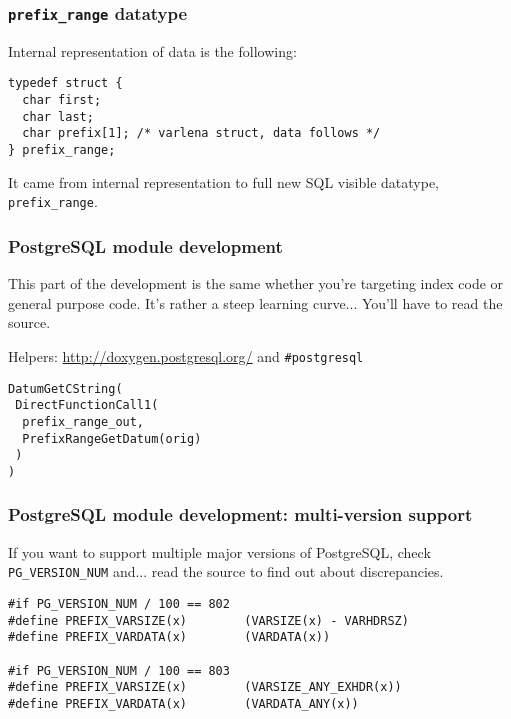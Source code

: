 \documentclass{beamer}
\begin{document}
\begin{frame}[fragile]
  \frametitle{\texttt{prefix\_range} datatype}

  Internal representation of data is the following:

  \begin{example}
  \begin{verbatim}
typedef struct {
  char first;
  char last;
  char prefix[1]; /* varlena struct, data follows */
} prefix_range;
  \end{verbatim}
  \end{example}

  It came from internal representation to full new SQL visible datatype,
  \texttt{prefix\_range}.
\end{frame}

\begin{frame}[fragile]
  \frametitle{PostgreSQL module development}

  This part of the development is the same whether you're targeting index
  code or general purpose code. It's rather a steep learning curve... You'll
  have to read the source.

  Helpers: \url{http://doxygen.postgresql.org/} and \texttt{\#postgresql}

  \begin{example}
  \begin{verbatim}
DatumGetCString(
 DirectFunctionCall1(
  prefix_range_out,
  PrefixRangeGetDatum(orig)
 )
)
  \end{verbatim}
  \end{example}
\end{frame}

\begin{frame}[fragile]
  \frametitle{PostgreSQL module development: multi-version support}

  If you want to support multiple major versions of PostgreSQL, check
  \texttt{PG\_VERSION\_NUM} and... read the source to find out about
  discrepancies.

  \begin{example}
  \begin{verbatim}
#if PG_VERSION_NUM / 100 == 802
#define PREFIX_VARSIZE(x)        (VARSIZE(x) - VARHDRSZ)
#define PREFIX_VARDATA(x)        (VARDATA(x))

#if PG_VERSION_NUM / 100 == 803
#define PREFIX_VARSIZE(x)        (VARSIZE_ANY_EXHDR(x))
#define PREFIX_VARDATA(x)        (VARDATA_ANY(x))
  \end{verbatim}
  \end{example}
\end{frame}
\end{document}
